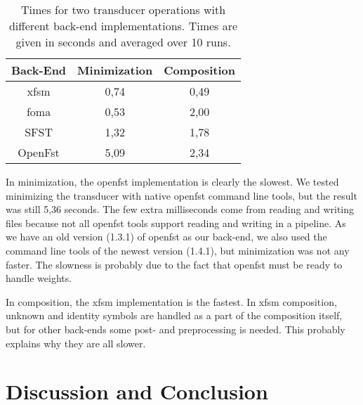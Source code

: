 \documentclass{llncs}
\begin{document}
\begin{table}[h!]
  \centering
  \caption{Times for two transducer operations with different back-end implementations.
    Times are given in seconds and averaged over 10 runs.}
  \begin{tabular}{c c c }
    \hline
    Back-End & Minimization & Composition \\ \hline
    xfsm & 0,74 & 0,49 \\
    foma & 0,53 & 2,00 \\
    SFST & 1,32 & 1,78 \\
    OpenFst & 5,09 & 2,34 \\ \hline
  \end{tabular}
  \label{operationtimes}
\end{table}

In minimization, the openfst implementation is clearly the slowest. We tested minimizing
the transducer with native openfst command line tools, but the result was still 5,36 seconds.
The few extra milliseconds come from reading and writing files because not all openfst tools support reading
and writing in a pipeline. As we have an old version (1.3.1) of openfst as our back-end, we also
used the command line tools of the newest version (1.4.1), but minimization was not any faster.
The slowness is probably due to the fact that openfst must be ready to handle weights.

In composition, the xfsm implementation is the fastest. In xfsm composition, unknown and identity
symbols are handled as a part of the composition itself, but for other back-ends some post- and preprocessing is
needed. This probably explains why they are all slower.

\section{Discussion and Conclusion}\label{sec:discussion}



\end{document}
